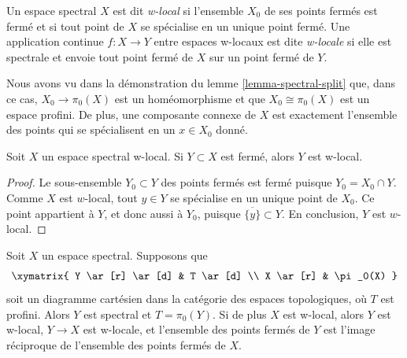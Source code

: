 \begin{definition}
\label{definition-w-local}
Un espace spectral $X$ est dit {\it w-local} si l'ensemble $X_0$ de ses points ferm\'es
est ferm\'e et si tout point de $X$ se sp\'ecialise en un unique point ferm\'e.
Une application continue $f : X \to Y$ entre espaces w-locaux est dite {\it w-locale}
si elle est spectrale et envoie tout point ferm\'e de $X$ sur un point ferm\'e de $Y$.
\end{definition}

\noindent
Nous avons vu dans la d\'emonstration du lemme \ref{lemma-spectral-split}
que, dans ce cas, $X_0 \to \pi_0(X)$ est un hom\'eomorphisme et que
$X_0 \cong \pi_0(X)$ est un espace profini. De plus, une composante
connexe de $X$ est exactement l'ensemble des points qui se sp\'ecialisent en
un $x \in X_0$ donn\'e.

\begin{lemma}
\label{lemma-closed-subspace-w-local}
Soit $X$ un espace spectral w-local. Si $Y \subset X$ est ferm\'e,
alors $Y$ est w-local.
\end{lemma}

\begin{proof}
Le sous-ensemble $Y_0 \subset Y$ des points ferm\'es est ferm\'e puisque
$Y_0 = X_0 \cap Y$. Comme $X$ est $w$-local, tout $y \in Y$ se sp\'ecialise
en un unique point de $X_0$. Ce point appartient \`a $Y$, et donc
aussi \`a $Y_0$, puisque $\overline{\{y\}}\subset Y$. En conclusion, $Y$
est $w$-local.
\end{proof}

\begin{lemma}
\label{lemma-silly}
Soit $X$ un espace spectral. Supposons que
$$
\xymatrix{
Y \ar[r] \ar[d] & T \ar[d] \\
X \ar[r] & \pi_0(X)
}
$$
soit un diagramme cart\'esien dans la cat\'egorie des espaces topologiques,
o\`u $T$ est profini. Alors $Y$ est spectral et $T = \pi_0(Y)$.
Si de plus $X$ est w-local, alors $Y$ est w-local, $Y \to X$ est w-locale,
et l'ensemble des points ferm\'es de $Y$ est l'image r\'eciproque de
l'ensemble des points ferm\'es de $X$.
\end{lemma}

